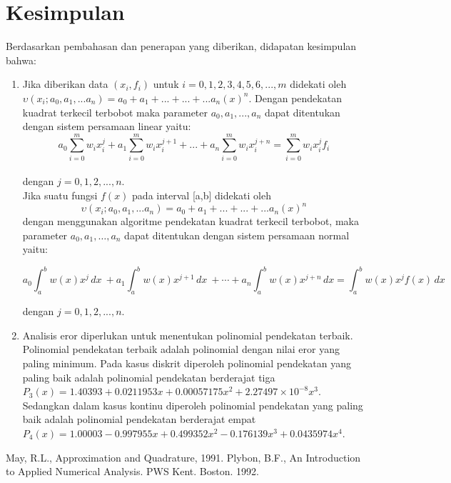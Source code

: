 \documentclass[a4paper,12pt]{article}
\begin{document}
\section{Kesimpulan}
Berdasarkan pembahasan dan penerapan yang diberikan, didapatan kesimpulan bahwa:
\begin{enumerate}
	\item Jika diberikan data $(x_i,f_i)$ untuk $i=0,1,2,3,4,5,6,...,m$ didekati oleh \\
	$\upsilon(x_i;a_0,a_1,...a_n)= a_0+a_1+...+...+...a_n(x)^{n}$. Dengan pendekatan kuadrat terkecil terbobot maka parameter $a_0,a_1,...,a_n$ dapat ditentukan dengan sistem persamaan linear yaitu:
	$$ a_0\sum_{i=0}^m w_ix_i^{j}+a_1\sum_{i=0}^m w_ix_i^{j+1}+...+a_n\sum_{i=0}^m w_ix_i^{j+n}=\sum_{i=0}^m w_ix_i^{j}f_i$$
	\\dengan $j = 0, 1, 2, ..., n.$
	\vspace{0.2cm}
	\\Jika suatu fungsi $f(x)$ pada interval [a,b] didekati oleh 
	$$\upsilon(x_i;a_0,a_1,...a_n)= a_0+a_1+...+...+...a_n(x)^{n}$$
	dengan menggunakan algoritme pendekatan kuadrat terkecil terbobot, maka parameter $a_0,a_1,…,a_n$ dapat ditentukan dengan sistem persamaan normal yaitu:
	\begin{footnotesize}
		\begin{equation*}
			a_0\int_{a}^{b} w(x)x^j\,dx \ + a_1\int_{a}^{b} w(x)x^{j+1} \,dx \ + \cdots + a_n\int_{a}^{b} w(x)x^{j+n}\,dx = \int_{a}^{b} w(x)x^jf(x)\,dx
		\end{equation*}
	\end{footnotesize}
	dengan $j = 0, 1, 2, ..., n.$
	\vspace{0.25cm}
	\item Analisis eror diperlukan untuk menentukan polinomial pendekatan terbaik. Polinomial pendekatan terbaik adalah polinomial dengan nilai eror yang paling minimum. Pada kasus diskrit diperoleh polinomial pendekatan yang paling baik adalah polinomial pendekatan berderajat tiga $P_3(x)= 1.40393 + 0.0211953x + 0.00057175x^2 + 2.27497 \times 10^{-8}x^3$. Sedangkan dalam kasus kontinu diperoleh polinomial pendekatan yang paling baik adalah polinomial pendekatan berderajat empat $P_4(x) = 1.00003 - 0.997955x + 0.499352x^2 -0.176139x^3 + 0.0435974x^4$.
	
\end{enumerate}
\begin{thebibliography}{15}
	May, R.L., Approximation and Quadrature, 1991.
	Plybon, B.F., An Introduction to Applied Numerical Analysis. PWS Kent. Boston. 1992. 

	
\end{thebibliography}
\end{document}
